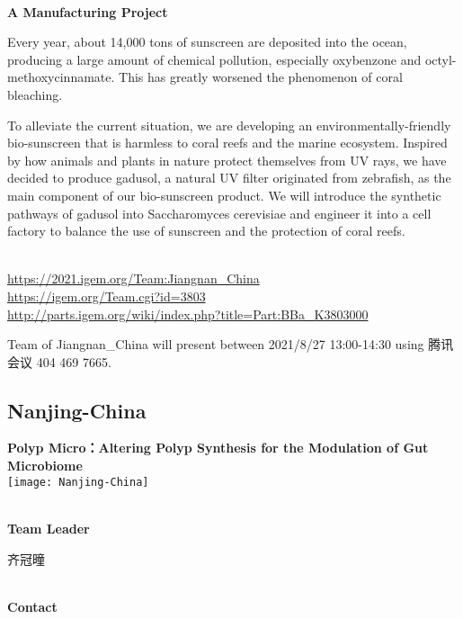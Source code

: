 \textbf{\\A Manufacturing Project\\}\begin{spacing}{1.5}

Every year, about 14,000 tons of sunscreen are deposited into the ocean, producing a large amount of chemical pollution, especially oxybenzone and octyl-methoxycinnamate. This has greatly worsened the phenomenon of coral bleaching.

To alleviate the current situation, we are developing an environmentally-friendly bio-sunscreen that is harmless to coral reefs and the marine ecosystem. Inspired by how animals and plants in nature protect themselves from UV rays, we have decided to produce gadusol, a natural UV filter originated from zebrafish, as the main component of our bio-sunscreen product. We will introduce the synthetic pathways of gadusol into Saccharomyces cerevisiae and engineer it into a cell factory to balance the use of sunscreen and the protection of coral reefs.\end{spacing}
\\

\url{https://2021.igem.org/Team:Jiangnan\_China }\\
\url{https://igem.org/Team.cgi?id=3803 }\\
\url{http://parts.igem.org/wiki/index.php?title=Part:BBa_K3803000 }\\


\vfill{}









Team of Jiangnan\_China will present between 2021/8/27 13:00-14:30        using 腾讯会议 404 469 7665.
\newpage


\subsection{\textcolor{Blu}{ Nanjing-China } }
\vspace{5mm}
\begin{center}
\large{
  \textbf{ Polyp Micro：Altering Polyp Synthesis for the Modulation of Gut Microbiome }\\
  \texttt{[image: Nanjing-China]}
}
\end{center}
\textbf{\\Team Leader}

  齐冠曈


\textbf{\\Contact}

